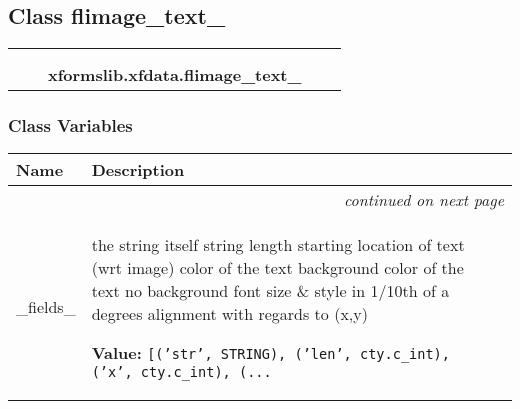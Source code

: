 

\subsection{Class flimage\_text\_}

    \label{xformslib:xfdata:flimage_text_}
\begin{tabular}{cccccc}
\multicolumn{2}{r}{\settowidth{\BCL}{ctypes.Structure}\multirow{2}{\BCL}{ctypes.Structure}}
&&
  \\\cline{3-3}
  &&\multicolumn{1}{c|}{}
&&
  \\
&&\multicolumn{2}{l}{\textbf{xformslib.xfdata.flimage\_text\_}}
\end{tabular}



  \subsubsection{Class Variables}

    \vspace{-1cm}
\hspace{\varindent}\begin{longtable}{|p{\varnamewidth}|p{\vardescrwidth}|l}
\cline{1-2}
\cline{1-2} \centering \textbf{Name} & \centering \textbf{Description}& \\
\cline{1-2}
\endhead\cline{1-2}\multicolumn{3}{r}{\small\textit{continued on next page}}\\\endfoot\cline{1-2}
\endlastfoot\raggedright \_\-f\-i\-e\-l\-d\-s\-\_\- & \raggedright the string itself
string length
starting location of text (wrt image)
color of the text
background color of the text
no background
font size \& style
in 1/10th of a degrees
alignment with regards to (x,y)

\textbf{Value:} 
{\tt [('str', STRING), ('len', cty.c\_int), ('x', cty.c\_int), (\texttt{...}}&\\
\cline{1-2}
\end{longtable}

